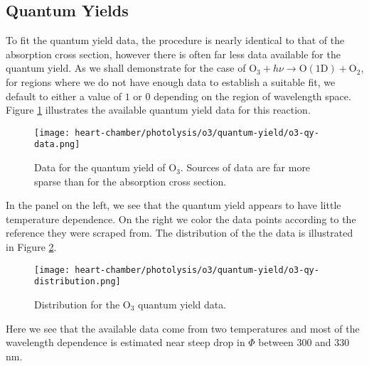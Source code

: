 \subsection{Quantum Yields}

To fit the quantum yield data, the procedure is nearly identical to that of the absorption cross section, however there is often far less data available for the quantum yield. As we shall demonstrate for the case of $\mathrm{O_3} + h\nu \longrightarrow \mathrm{O(1D)} + \mathrm{O_2}$, for regions where we do not have enough data to establish a suitable fit, we default to either a value of $1$ or $0$ depending on the region of wavelength space. Figure \ref{fig:qy-o3-data} illustrates the available quantum yield data for this reaction.
\begin{figure}[!hbt]
  \centering
  \texttt{[image: heart-chamber/photolysis/o3/quantum-yield/o3-qy-data.png]}
  \caption{Data for the quantum yield of $\mathrm{O_3}$. Sources of data are far more sparse than for the absorption cross section.}
  \label{fig:qy-o3-data}
\end{figure}
In the panel on the left, we see that the quantum yield appears to have little temperature dependence. On the right we color the data points according to the reference they were scraped from. The distribution of the the data is illustrated in Figure \ref{fig:qy-o3-dist}.
\begin{figure}[!hbt]
  \centering
  \texttt{[image: heart-chamber/photolysis/o3/quantum-yield/o3-qy-distribution.png]}
  \caption{Distribution for the $\mathrm{O_3}$ quantum yield data.}
  \label{fig:qy-o3-dist}
\end{figure}
Here we see that the available data come from two temperatures and most of the wavelength dependence is estimated near steep drop in $\Phi$ between $300$ and $330$ nm.

